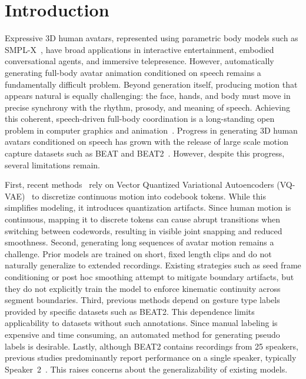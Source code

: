 \section{Introduction}
\label{sec:intro}
Expressive 3D human avatars, represented using parametric body models such as SMPL-X~\cite{smplx}, have broad applications in interactive entertainment, embodied conversational agents, and immersive telepresence.
However, automatically generating full-body avatar animation conditioned on speech remains a fundamentally difficult problem.
Beyond generation itself, producing motion that appears natural is equally challenging: the face, hands, and body must move in precise synchrony with the rhythm, prosody, and meaning of speech.
Achieving this coherent, speech-driven full-body coordination is a long-standing open problem in computer graphics and animation~\cite{mcneill1992hand,s2g,beat,emage2024}.
Progress in generating 3D human avatars conditioned on speech has grown with the release of large scale motion capture datasets such as BEAT and BEAT2~\cite{beat,emage2024}.
However, despite this progress, several limitations remain.

First, recent methods~\cite{talkshow2023,gesturediffuclip,syntalker} rely on Vector Quantized Variational Autoencoders (VQ-VAE)~\cite{vqvae,vqvae2} to discretize continuous motion into codebook tokens.
While this simplifies modeling, it introduces quantization artifacts.
Since human motion is continuous, mapping it to discrete tokens can cause abrupt transitions when switching between codewords, resulting in visible joint snapping and reduced smoothness.
Second, generating long sequences of avatar motion remains a challenge.
Prior models are trained on short, fixed length clips and do not naturally generalize to extended recordings.
Existing strategies such as seed frame conditioning or post hoc smoothing attempt to mitigate boundary artifacts, but they do not explicitly train the model to enforce kinematic continuity across segment boundaries.
Third, previous methods depend on gesture type labels provided by specific datasets such as BEAT2.
This dependence limits applicability to datasets without such annotations.
Since manual labeling is expensive and time consuming, an automated method for generating pseudo labels is desirable.
Lastly, although BEAT2 contains recordings from 25 speakers, previous studies predominantly report performance on a single speaker, typically Speaker~2~\cite{emage2024,syntalker}.
This raises concerns about the generalizability of existing models.

